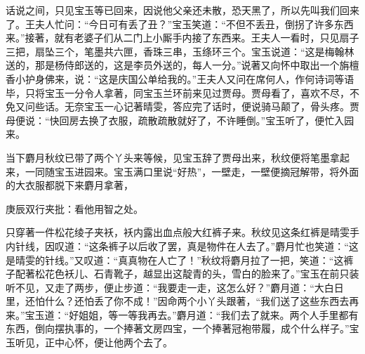 \begin{parag}
    话说之间，只见宝玉等已回来，因说他父亲还未散，恐天黑了，所以先叫我们回来了。王夫人忙问：“今日可有丢了丑？”宝玉笑道：“不但不丢丑，倒拐了许多东西来。”接著，就有老婆子们从二门上小厮手内接了东西来。王夫人一看时，只见扇子三把，扇坠三个，笔墨共六匣，香珠三串，玉绦环三个。宝玉说道：“这是梅翰林送的，那是杨侍郎送的，这是李员外送的，每人一分。”说著又向怀中取出一个旃檀香小护身佛来，说：“这是庆国公单给我的。”王夫人又问在席何人，作何诗词等语毕，只将宝玉一分令人拿著，同宝玉兰环前来见过贾母。贾母看了，喜欢不尽，不免又问些话。无奈宝玉一心记著晴雯，答应完了话时，便说骑马颠了，骨头疼。贾母便说：“快回房去换了衣服，疏散疏散就好了，不许睡倒。”宝玉听了，便忙入园来。
\end{parag}


\begin{parag}
    当下麝月秋纹已带了两个丫头来等候，见宝玉辞了贾母出来，秋纹便将笔墨拿起来，一同随宝玉进园来。宝玉满口里说“好热”，一壁走，一壁便摘冠解带，将外面的大衣服都脱下来麝月拿著，\begin{note}庚辰双行夹批：看他用智之处。\end{note}只穿著一件松花绫子夹袄，袄内露出血点般大红裤子来。秋纹见这条红裤是晴雯手内针线，因叹道：“这条裤子以后收了罢，真是物件在人去了。”麝月忙也笑道：“这是晴雯的针线。”又叹道：“真真物在人亡了！”秋纹将麝月拉了一把，笑道：“这裤子配著松花色袄儿、石青靴子，越显出这靛青的头，雪白的脸来了。”宝玉在前只装听不见，又走了两步，便止步道：“我要走一走，这怎么好？”麝月道：“大白日里，还怕什么？还怕丢了你不成！”因命两个小丫头跟著，“我们送了这些东西去再来。”宝玉道：“好姐姐，等一等我再去。”麝月道：“我们去了就来。两个人手里都有东西，倒向摆执事的，一个捧著文房四宝，一个捧著冠袍带履，成个什么样子。”宝玉听见，正中心怀，便让他两个去了。
\end{parag}



